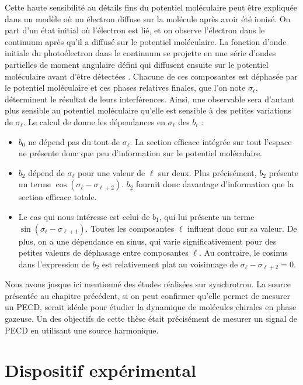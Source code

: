 Cette haute sensibilité au détails fins du potentiel moléculaire peut être expliquée dans un modèle où un électron diffuse sur la molécule après avoir été ionisé. On part d'un état initial où l'électron est lié, et on observe l'électron dans le continuum après qu'il a diffusé sur le potentiel moléculaire. La fonction d'onde initiale du photoélectron dans le continuum se projette en une série d'ondes partielles de moment angulaire défini qui diffusent ensuite sur le potentiel moléculaire avant d'être détectées . Chacune de ces composantes est déphasée par le potentiel moléculaire et ces phases relatives finales, que l'on note $\sigma_\ell$, déterminent le résultat de leurs interférences. Ainsi, une observable sera d'autant plus sensible au potentiel moléculaire qu'elle est sensible à des petites variations de $\sigma_\ell$. Le calcul de  donne les dépendances en $\sigma_\ell$ des $b_i$ :

\begin{itemize}
\renewcommand{\labelitemi}{$\bullet$}
\setlength\itemsep{1em}
\item $b_0$ ne dépend pas du tout de $\sigma_\ell$. La section efficace intégrée sur tout l'espace ne présente donc que peu d'information sur le potentiel moléculaire.
\item $b_2$ dépend de $\sigma_\ell$ pour une valeur de $\ell$ sur deux. Plus précisément, $b_2$ présente un terme $\cos(\sigma_\ell-\sigma_{\ell+2})$. $b_2$ fournit donc davantage d'information que la section efficace totale.
\item Le cas qui nous intéresse est celui de $b_1$, qui lui présente un terme $\sin(\sigma_\ell-\sigma_{\ell+1})$. Toutes les composantes $\ell$ influent donc sur sa valeur. De plus, on a une dépendance en sinus, qui varie significativement pour des petites valeurs de déphasage entre composantes $\ell$. Au contraire, le cosinus dans l'expression de $b_2$ est relativement plat au voisinnage de $\sigma_\ell-\sigma_{\ell+2} = 0$.
\end{itemize}

Nous avons jusque ici mentionné des études réalisées sur synchrotron. La source présentée au chapitre précédent, si on peut confirmer qu'elle permet de mesurer un PECD, serait idéale pour étudier la dynamique de molécules chirales en phase gazeuse. Un des objectifs de cette thèse était précisément de mesurer un signal de PECD en utilisant une source harmonique.

\section{Dispositif expérimental}
